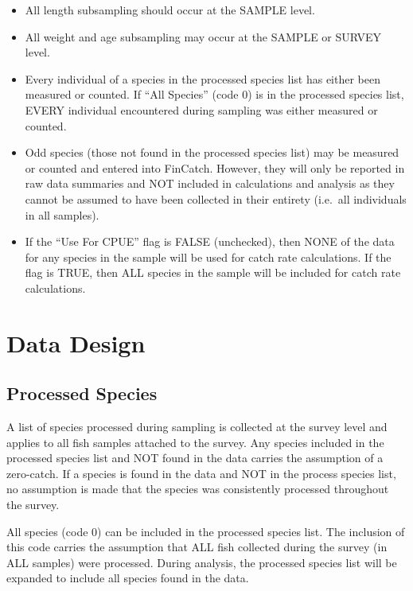 \documentclass[
  letterpaper,
  DIV=11,
  numbers=noendperiod]{scrreprt}
\begin{document}
\begin{itemize}
\item
  All length subsampling should occur at the SAMPLE level.
\item
  All weight and age subsampling may occur at the SAMPLE or SURVEY
  level.
\item
  Every individual of a species in the processed species list has either
  been measured or counted. If ``All Species'' (code 0) is in the
  processed species list, EVERY individual encountered during sampling
  was either measured or counted.
\item
  Odd species (those not found in the processed species list) may be
  measured or counted and entered into FinCatch. However, they will only
  be reported in raw data summaries and NOT included in calculations and
  analysis as they cannot be assumed to have been collected in their
  entirety (i.e.~all individuals in all samples).
\item
  If the ``Use For CPUE'' flag is FALSE (unchecked), then NONE of the
  data for any species in the sample will be used for catch rate
  calculations. If the flag is TRUE, then ALL species in the sample will
  be included for catch rate calculations.
\end{itemize}

\chapter{Data Design}\label{data-design}

\section{Processed Species}\label{processed-species}

A list of species processed during sampling is collected at the survey
level and applies to all fish samples attached to the survey. Any
species included in the processed species list and NOT found in the data
carries the assumption of a zero-catch. If a species is found in the
data and NOT in the process species list, no assumption is made that the
species was consistently processed throughout the survey.

All species (code 0) can be included in the processed species list. The
inclusion of this code carries the assumption that ALL fish collected
during the survey (in ALL samples) were processed. During analysis, the
processed species list will be expanded to include all species found in
the data.
\end{document}

